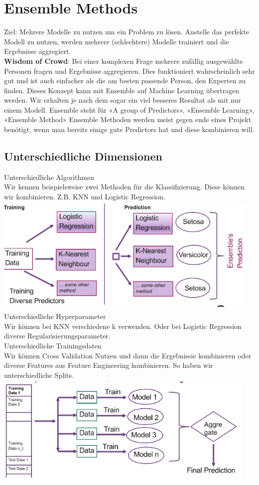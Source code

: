 \section{Ensemble Methods}
Ziel: Mehrere Modelle zu nutzen um ein Problem zu lösen. Anstelle das perfekte Modell zu nutzen, werden mehrere (schlechtere) Modelle trainiert und die Ergebnisse aggregiert.\\
\textbf{Wisdom of Crowd}: Bei einer komplexen Frage mehrere zufällig ausgewählte Personen fragen und Ergebnisse aggregieren. Dies funktioniert wahrscheinlich sehr gut und ist auch einfacher als die am besten passende Person, den Experten zu finden. Dieses Konzept kann mit Ensemble auf Machine Learning übertragen werden. Wir erhalten je nach dem sogar ein viel besseres Resultat als mit nur einem Modell. Ensemble steht für «A group of Predictors», «Ensemble Learning», «Ensemble Method» Ensemble Methoden werden meist gegen ende eines Projekt benötigt, wenn man bereits einige gute Predictors hat und diese kombinieren will.
\subsection{Unterschiedliche Dimensionen}
\textcolor{myblue}{Unterschiedliche Algorithmen}\\
Wir kennen beispielsweise zwei Methoden für die Klassifizierung. Diese können wir kombinieren. Z.B. KNN und Logistic Regression.
\includegraphics[width=\linewidth]{img/diverse_predictors.png}
\textcolor{myblue}{Unterschiedliche Hyperparameter}\\
Wir können bei KNN verschiedene k verwenden. Oder bei Logistic Regression diverse Regularisierungsparameter.\\
\textcolor{myblue}{Unterschiedliche Trainingsdaten}\\
Wir können Cross Validation Nutzen und dann die Ergebnissie kombinieren oder diverse Features aus Feature Engineering kombinieren. So haben wir unterschiedliche Splits.
\includegraphics[width=\linewidth]{img/diverse_training_data.png}
